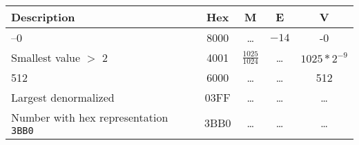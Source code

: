 \documentclass[a4paper]{article}
\begin{document}
\begin{table}[h]
\begin{tabular}{lcccc}
Description &Hex &M &E &V\\\hline
--0&8000
& \ldots %
& $-14$
&-0\\
Smallest value $>$ 2&4001 
& $\frac{1025}{1024}$
& \ldots %
& $1025*2^{-9}$
\\
512&6000
& \ldots %
& \ldots %
& 512
\\
Largest denormalized&03FF
& \ldots %
& \ldots %
& \ldots %
\\
Number with hex representation \texttt{3BB0}&3BB0
& \ldots %
& \ldots %
& \ldots %
\\
\end{tabular}
\end{table}

\clearpage
\end{document}
